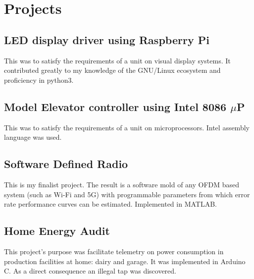 \documentclass[a4paper,10pt]{article}
\begin{document}

\section{Projects}
\subsection{LED display driver using Raspberry Pi}
This was to satisfy the requirements of a unit on visual display systems. It contributed greatly to my knowledge of the GNU/Linux ecosystem and proficiency in python3.
\subsection{Model Elevator controller using Intel 8086 $\mu$P}
This was to satisfy the requirements of a unit on microprocessors. Intel assembly language was used.
\subsection{Software Defined Radio}
This is my finalist project. The result is a software mold of any OFDM based system (such as Wi-Fi and 5G) with programmable parameters from which error rate performance curves can be estimated. Implemented in MATLAB.
\subsection{Home Energy Audit}
This project's purpose was facilitate telemetry on power consumption in production facilities at home: dairy and garage. It was implemented in Arduino C. As a direct consequence an illegal tap was discovered.

\end{document}
